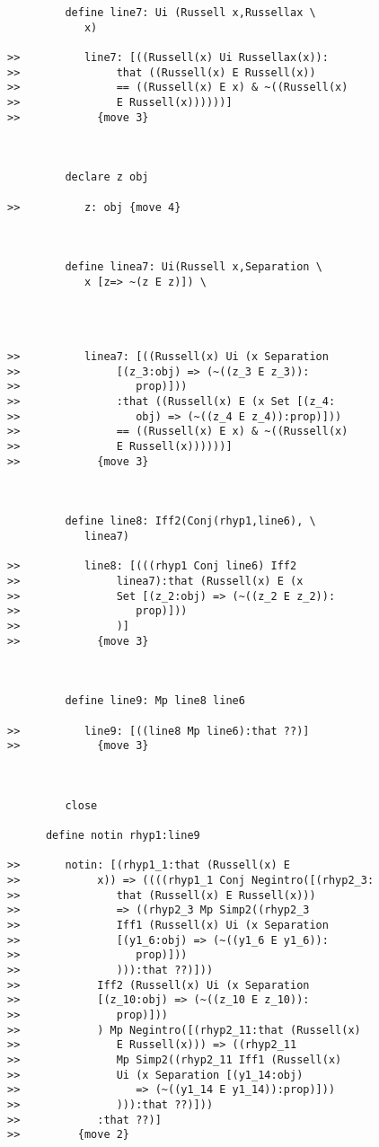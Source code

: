 \documentclass[12pt]{article}
\begin{document}
\begin{verbatim}
         define line7: Ui (Russell x,Russellax \
            x)

>>          line7: [((Russell(x) Ui Russellax(x)):
>>               that ((Russell(x) E Russell(x))
>>               == ((Russell(x) E x) & ~((Russell(x)
>>               E Russell(x))))))]
>>            {move 3}



         declare z obj

>>          z: obj {move 4}



         define linea7: Ui(Russell x,Separation \
            x [z=> ~(z E z)]) \
            



>>          linea7: [((Russell(x) Ui (x Separation
>>               [(z_3:obj) => (~((z_3 E z_3)):
>>                  prop)]))
>>               :that ((Russell(x) E (x Set [(z_4:
>>                  obj) => (~((z_4 E z_4)):prop)]))
>>               == ((Russell(x) E x) & ~((Russell(x)
>>               E Russell(x))))))]
>>            {move 3}



         define line8: Iff2(Conj(rhyp1,line6), \
            linea7)

>>          line8: [(((rhyp1 Conj line6) Iff2
>>               linea7):that (Russell(x) E (x
>>               Set [(z_2:obj) => (~((z_2 E z_2)):
>>                  prop)]))
>>               )]
>>            {move 3}



         define line9: Mp line8 line6

>>          line9: [((line8 Mp line6):that ??)]
>>            {move 3}



         close

      define notin rhyp1:line9

>>       notin: [(rhyp1_1:that (Russell(x) E
>>            x)) => ((((rhyp1_1 Conj Negintro([(rhyp2_3:
>>               that (Russell(x) E Russell(x)))
>>               => ((rhyp2_3 Mp Simp2((rhyp2_3
>>               Iff1 (Russell(x) Ui (x Separation
>>               [(y1_6:obj) => (~((y1_6 E y1_6)):
>>                  prop)]))
>>               ))):that ??)]))
>>            Iff2 (Russell(x) Ui (x Separation
>>            [(z_10:obj) => (~((z_10 E z_10)):
>>               prop)]))
>>            ) Mp Negintro([(rhyp2_11:that (Russell(x)
>>               E Russell(x))) => ((rhyp2_11
>>               Mp Simp2((rhyp2_11 Iff1 (Russell(x)
>>               Ui (x Separation [(y1_14:obj)
>>                  => (~((y1_14 E y1_14)):prop)]))
>>               ))):that ??)]))
>>            :that ??)]
>>         {move 2}




\end{verbatim}
\end{document}
